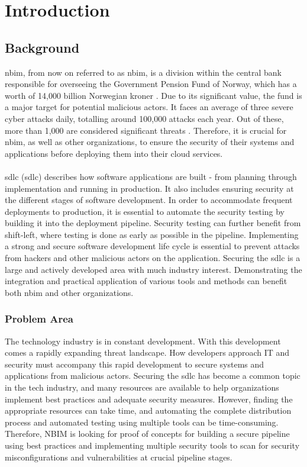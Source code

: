 \chapter{Introduction}

\section{Background} %
\acrlong{nbim}, from now on referred to as \acrshort{nbim}, is a division within the central bank responsible for overseeing the Government Pension Fund of Norway, which has a worth of 14,000 billion Norwegian kroner \cite{nbimwebsite}. Due to its significant value, the fund is a major target for potential malicious actors. It faces an average of three severe cyber attacks daily, totalling around 100,000 attacks each year. Out of these, more than 1,000 are considered significant threats \cite{nbimattacks}. Therefore, it is crucial for \acrshort{nbim}, as well as other organizations, to ensure the security of their systems and applications before deploying them into their cloud services. 
\\~\\
\acrlong{sdlc} (\acrshort{sdlc}) describes how software applications are built - from planning through implementation and running in production. It also includes ensuring security at the different stages of software development. In order to accommodate frequent deployments to production, it is essential to automate the security testing by building it into the deployment pipeline. Security testing can further benefit from shift-left, where testing is done as early as possible in the pipeline. Implementing a strong and secure software development life cycle is essential to prevent attacks from hackers and other malicious actors on the application. Securing the \acrshort{sdlc} is a large and actively developed area with much industry interest. Demonstrating the integration and practical application of various tools and methods can benefit both \acrshort{nbim} and other organizations.

\subsection{Problem Area}
The technology industry is in constant development. With this development comes a rapidly expanding threat landscape. How developers approach IT and security must accompany this rapid development to secure systems and applications from malicious actors. Securing the \acrlong{sdlc} has become a common topic in the tech industry, and many resources are available to help organizations implement best practices and adequate security measures. However, finding the appropriate resources can take time, and automating the complete distribution process and automated testing using multiple tools can be time-consuming. Therefore, NBIM is looking for proof of concepts for building a secure pipeline using best practices and implementing multiple security tools to scan for security misconfigurations and vulnerabilities at crucial pipeline stages. 

